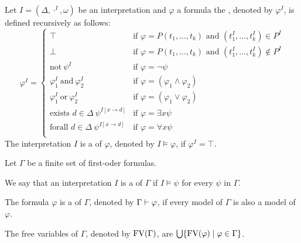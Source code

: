 \begin{definition}
Let $I=(\Delta,\cdot^I,\omega)$ be an interpretation and $\varphi$ a formula the , denoted by $\varphi^I$, is defined recursively as follows:
\[\varphi^I=
\begin{cases}
\top & \text{if $\varphi=P(t_1,\dots,t_k)$ and $(t^I_1,\dots,t^I_k)\in P^I$}\\
\bot & \text{if $\varphi=P(t_1,\dots,t_k)$ and $(t^I_1,\dots,t^I_k)\notin P^I$}\\
\text{not}~\psi^I & \text{if $\varphi=\neg\psi$}\\
\varphi^I_1~\text{and}~\varphi^I_2 & \text{if $\varphi=(\varphi_1\wedge\varphi_2)$}\\
\varphi^I_1~\text{or}~\varphi^I_2 & \text{if $\varphi=(\varphi_1\vee\varphi_2)$}\\
\text{exists $d\in\Delta$}~\psi^{I\left[x\to d\right]} & \text{if $\varphi=\exists x\psi$}\\
\text{forall $d\in\Delta$}~\psi^{I\left[x\to d\right]} & \text{if $\varphi=\forall x\psi$}\\
\end{cases}\]
The interpretation $I$ is a  of $\varphi$, denoted by $I\models\varphi$, if $\varphi^I=\top$.
\end{definition}
\begin{definition}
Let $\Gamma$ be a finite set of first-oder formulas.
\begin{description}
\item We say that an interpretation $I$ is a  of $\Gamma$ if $I\models\psi$ for every $\psi$ in $\Gamma$.
\item The formula $\varphi$ is a  of $\Gamma$, denoted by $\Gamma\vdash\varphi$, if every model of $\Gamma$ is also a model of $\varphi$.
\item The free variables of $\Gamma$, denoted by $\text{FV}(\Gamma)$, are $\bigcup\{\text{FV}(\varphi)\mid \varphi\in \Gamma\}$.
\end{description}
\end{definition}